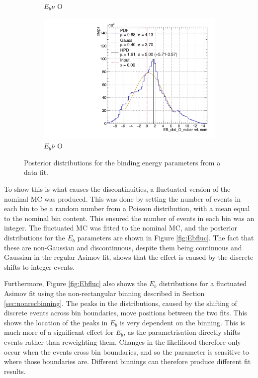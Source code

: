 \begin{figure}[t]
\begin{subfigure}{.48\textwidth}
  \caption{$E_{b}\nu$ O}
\end{subfigure}
\begin{subfigure}{.48\textwidth}
  \centering
  \includegraphics[width=0.73\linewidth]{figs/EB_dial_O_nubarData}
  \caption{$E_{b}\bar{\nu}$ O}
\end{subfigure}
\caption{Posterior distributions for the binding energy parameters from a data fit.}
\label{fig:Ebdata}
\end{figure}

To show this is what causes the discontinuities, a fluctuated version of the nominal MC was produced. This was done by setting the number of events in each bin to be a random number from a Poisson distribution, with a mean equal to the nominal bin content. This ensured the number of events in each bin was an integer. The fluctuated MC was fitted to the nominal MC, and the posterior distributions for the $E_b$ parameters are shown in Figure \ref{fig:Ebfluc}. The fact that these are non-Gaussian and discontinuous, despite them being continuous and Gaussian in the regular Asimov fit, shows that the effect is caused by the discrete shifts to integer events.

Furthermore, Figure \ref{fig:Ebfluc} also shows the $E_b$ distributions for a fluctuated Asimov fit using the non-rectangular binning described in Section \ref{sec:nonrecbinning}. The peaks in the distributions, caused by the shifting of discrete events across bin boundaries, move positions between the two fits. This shows the location of the peaks in $E_{b}$ is very dependent on the binning. This is much more of a significant effect for $E_b$, as the parametrisation directly shifts events rather than reweighting them. Changes in the likelihood therefore only occur when the events cross bin boundaries, and so the parameter is sensitive to where those boundaries are. Different binnings can therefore produce different fit results.


